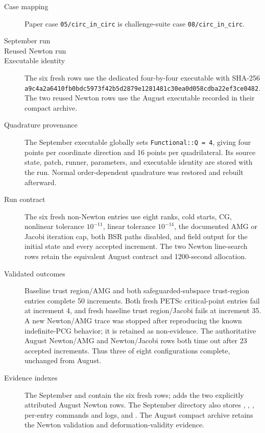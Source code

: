 \documentclass[11pt]{article}
\newcommand{\sha}[2]{\texttt{#1}\allowbreak\texttt{#2}}
\begin{document}
\begin{description}
  \item[Case mapping] Paper case \texttt{05/circ\_in\_circ} is challenge-suite case \texttt{08/circ\_in\_circ}.
  \item[September run] 
  \item[Reused Newton run] 
  \item[Executable identity] The six fresh rows use the dedicated four-by-four executable with SHA-256 \sha{a9c4a2a6410fb0bdc5973f42b5d2879}{e1281481c30ea0d058cdba22ef3ce0482}.  The two reused Newton rows use the August executable recorded in their compact archive.
  \item[Quadrature provenance] The September executable globally sets \texttt{Functional::Q = 4}, giving four points per coordinate direction and 16 points per quadrilateral.  Its source state, patch, runner, parameters, and executable identity are stored with the run.  Normal order-dependent quadrature was restored and rebuilt afterward.
  \item[Run contract] The six fresh non-Newton entries use eight ranks, cold starts, CG, nonlinear tolerance $10^{-11}$, linear tolerance $10^{-14}$, the documented AMG or Jacobi iteration cap, both BSR paths disabled, and field output for the initial state and every accepted increment.  The two Newton line-search rows retain the equivalent August contract and 1200-second allocation.
  \item[Validated outcomes] Baseline trust region/AMG and both safeguarded-subspace trust-region entries complete 50 increments.  Both fresh PETSc critical-point entries fail at increment 4, and fresh baseline trust region/Jacobi fails at increment 35.  A new Newton/AMG trace was stopped after reproducing the known indefinite-PCG behavior; it is retained as non-evidence.  The authoritative August Newton/AMG and Newton/Jacobi rows both time out after 23 accepted increments.  Thus three of eight configurations complete, unchanged from August.
  \item[Evidence indexes] The September  and  contain the six fresh rows;  adds the two explicitly attributed August Newton rows.  The September directory also stores , , , per-entry commands and logs, and .  The August compact archive retains the Newton validation and deformation-validity evidence.

\end{description}
\end{document}
